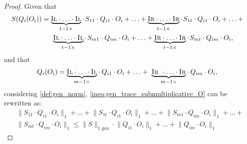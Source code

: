 \begin{proof}
  Given that
  \begin{equation}
  \begin{split} 
    S (Q_i (O_i)) & = \underbrace{\textsc{Il} \cdot \ldots \cdot \textsc{Il}}_{t-1 \times} \cdot \hspace{1pt} S_{11} \cdot Q_{i1} \cdot O_{i} + \ldots + \underbrace{\textsc{Ir} \cdot \ldots \cdot \textsc{Ir}}_{t-1 \times} \cdot \hspace{1pt} S_{1t} \cdot Q_{i1} \cdot O_{i} + \ldots +      \\
    & \hspace{15pt}  \underbrace{\textsc{Il} \cdot \ldots \cdot \textsc{Il}}_{t-1 \times}\cdot \hspace{1pt} S_{m1} \cdot Q_{im} \cdot O_{i} + \ldots + \underbrace{\textsc{Ir} \cdot \ldots \cdot \textsc{Ir}}_{t-1 \times} \cdot \hspace{1pt} S_{mt} \cdot Q_{im} \cdot O_{i},
  \end{split}
  \end{equation}
  and that
  \begin{equation}
    \begin{split}
       Q_i (O_i) = \underbrace{\textsc{Il} \cdot \ldots \cdot \textsc{Il}}_{m-1 \times} \cdot \hspace{2pt} Q_{i1} \cdot O_{i} + \ldots +  \underbrace{\textsc{Ir } \cdot \ldots \cdot \textsc{Ir}}_{m-1 \times} \cdot \hspace{2pt} Q_{im} \cdot O_{i},
    \end{split}
  \end{equation}
  considering \autoref{def:gen_norm}, \autoref{ineq:gen_trace_submultiplicative_O} can be rewritten as:
  \begin{equation}
    \begin{split}
    &\lVert S_{11} \cdot Q_{i1} \cdot O_{i} \rVert_{1} + \ldots + \lVert S_{1t} \cdot Q_{i1} \cdot O_{i} \rVert_{1} + \ldots + \lVert S_{m1} \cdot Q_{im} \cdot O_{i} \rVert_{1} + \ldots +  \\
    &  \lVert S_{mt} \cdot Q_{im} \cdot O_{i} \rVert_{1} \leq  \lVert S  \rVert_{1 \text{ gen}} \cdot \lVert Q_{i1} \cdot O_{i} \rVert_{1} + \ldots + \lVert Q_{im} \cdot O_{i} \rVert_{1}
    \end{split}
  \end{equation}
  

\end{proof}
